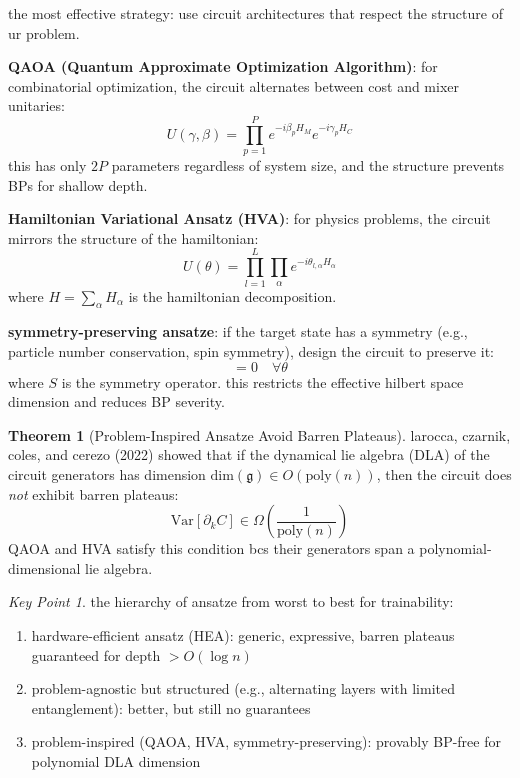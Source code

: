 \documentclass[11pt,a4paper]{article}
\theoremstyle{definition}
\newtheorem{theorem}{Theorem}[section]
\theoremstyle{remark}
\newtheorem*{keypoint}{Key Point}
\begin{document}
the most effective strategy: use circuit architectures that respect the structure of ur problem.

\textbf{QAOA (Quantum Approximate Optimization Algorithm)}: for combinatorial optimization, the circuit alternates between cost and mixer unitaries:
\begin{equation}
    U(\gamma, \beta) = \prod_{p=1}^{P} e^{-i\beta_p H_M} e^{-i\gamma_p H_C}
\end{equation}
this has only $2P$ parameters regardless of system size, and the structure prevents BPs for shallow depth.

\textbf{Hamiltonian Variational Ansatz (HVA)}: for physics problems, the circuit mirrors the structure of the hamiltonian:
\begin{equation}
    U(\theta) = \prod_{l=1}^{L} \prod_{\alpha} e^{-i\theta_{l,\alpha} H_\alpha}
\end{equation}
where $H = \sum_\alpha H_\alpha$ is the hamiltonian decomposition.

\textbf{symmetry-preserving ansatze}: if the target state has a symmetry (e.g., particle number conservation, spin symmetry), design the circuit to preserve it:
\begin{equation}
    [U(\theta), S] = 0 \quad \forall \theta
\end{equation}
where $S$ is the symmetry operator. this restricts the effective hilbert space dimension and reduces BP severity.

\begin{theorem}[Problem-Inspired Ansatze Avoid Barren Plateaus]
larocca, czarnik, coles, and cerezo (2022) showed that if the dynamical lie algebra (DLA) of the circuit generators has dimension $\text{dim}(\mathfrak{g}) \in O(\text{poly}(n))$, then the circuit does \emph{not} exhibit barren plateaus:
\begin{equation}
    \text{Var}[\partial_k C] \in \Omega\left(\frac{1}{\text{poly}(n)}\right)
\end{equation}
QAOA and HVA satisfy this condition bcs their generators span a polynomial-dimensional lie algebra.
\end{theorem}

\begin{keypoint}
the hierarchy of ansatze from worst to best for trainability:
\begin{enumerate}[label=\arabic*.]
    \item hardware-efficient ansatz (HEA): generic, expressive, barren plateaus guaranteed for depth $> O(\log n)$
    \item problem-agnostic but structured (e.g., alternating layers with limited entanglement): better, but still no guarantees
    \item problem-inspired (QAOA, HVA, symmetry-preserving): provably BP-free for polynomial DLA dimension
\end{enumerate}
\end{keypoint}
\end{document}
